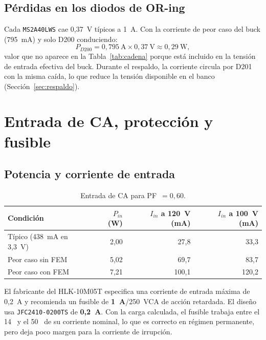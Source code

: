 \documentclass[11pt,a4paper]{article}
\newcommand{\pct}{\text{\char37}}
\begin{document}
\subsection{Pérdidas en los diodos de OR-ing}

Cada \texttt{MS2A40LWS} cae 0,37~V típicos a 1~A. Con la corriente de peor caso
del buck (795~mA) y solo D200 conduciendo:
\begin{equation}
P_{D200} = 0{,}795~\mathrm{A}\times 0{,}37~\mathrm{V} \approx 0{,}29~\mathrm{W},
\end{equation}
valor que no aparece en la Tabla~\ref{tab:cadena} porque está incluido en la
tensión de entrada efectiva del buck. Durante el respaldo, la corriente circula
por D201 con la misma caída, lo que reduce la tensión disponible en el banco
(Sección~\ref{sec:respaldo}).

\section{Entrada de CA, protección y fusible}
\label{sec:entrada}

\subsection{Potencia y corriente de entrada}

\begin{table}[H]
\centering
\caption{Entrada de CA para PF~$=0{,}60$.}
\label{tab:entrada}
\small
\begin{tabularx}{\textwidth}{@{}X r r r@{}}
\toprule
\textbf{Condición} & \textbf{$P_{in}$ (W)} & \textbf{$I_{in}$ a 120~V (mA)} & \textbf{$I_{in}$ a 100~V (mA)} \\
\midrule
Típico (438~mA en 3,3~V) & 2,00 & 27,8 & 33,3 \\
Peor caso sin FEM & 5,02 & 69,7 & 83,7 \\
Peor caso con FEM & 7,21 & 100,1 & 120,2 \\
\bottomrule
\end{tabularx}
\end{table}

\noindent El fabricante del HLK-10M05T especifica una corriente de entrada
máxima de 0,2~A y recomienda un fusible de \textbf{1~A}/250~VCA de acción
retardada. El diseño usa \texttt{JFC2410-0200TS} de \textbf{0,2~A}. Con la carga
calculada, el fusible trabaja entre el 14~\pct{} y el 50~\pct{} de su corriente
nominal, lo que es correcto en régimen permanente, pero deja poco margen para la
corriente de irrupción.
\end{document}
